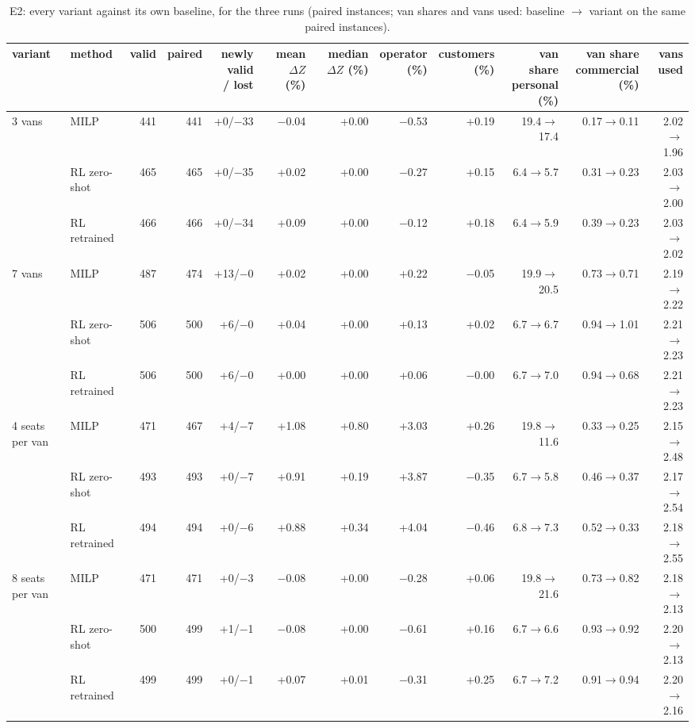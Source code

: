 \begin{table}[H]\centering
\scriptsize
\caption{E2: every variant against its own baseline, for the three runs (paired instances; van shares and vans used: baseline $\to$ variant on the same paired instances).}\label{tab:expE2}
\begin{adjustbox}{max width=\textwidth}\begin{tabular}{llrrrrrrrrrr}\toprule
variant & method & valid & paired & \shortstack{newly valid\\/ lost} & \shortstack{mean\\$\Delta Z$ (\%)} & \shortstack{median\\$\Delta Z$ (\%)} & \shortstack{operator\\(\%)} & \shortstack{customers\\(\%)} & \shortstack{van share\\personal (\%)} & \shortstack{van share\\commercial (\%)} & vans used \\ \midrule
3 vans & MILP & 441 & 441 & +0/$-$33 & $-$0.04 & +0.00 & $-$0.53 & +0.19 & 19.4$\to$17.4 & 0.17$\to$0.11 & 2.02$\to$1.96 \\
 & RL zero-shot & 465 & 465 & +0/$-$35 & +0.02 & +0.00 & $-$0.27 & +0.15 & 6.4$\to$5.7 & 0.31$\to$0.23 & 2.03$\to$2.00 \\
 & RL retrained & 466 & 466 & +0/$-$34 & +0.09 & +0.00 & $-$0.12 & +0.18 & 6.4$\to$5.9 & 0.39$\to$0.23 & 2.03$\to$2.02 \\
7 vans & MILP & 487 & 474 & +13/$-$0 & +0.02 & +0.00 & +0.22 & $-$0.05 & 19.9$\to$20.5 & 0.73$\to$0.71 & 2.19$\to$2.22 \\
 & RL zero-shot & 506 & 500 & +6/$-$0 & +0.04 & +0.00 & +0.13 & +0.02 & 6.7$\to$6.7 & 0.94$\to$1.01 & 2.21$\to$2.23 \\
 & RL retrained & 506 & 500 & +6/$-$0 & +0.00 & +0.00 & +0.06 & $-$0.00 & 6.7$\to$7.0 & 0.94$\to$0.68 & 2.21$\to$2.23 \\
4 seats per van & MILP & 471 & 467 & +4/$-$7 & +1.08 & +0.80 & +3.03 & +0.26 & 19.8$\to$11.6 & 0.33$\to$0.25 & 2.15$\to$2.48 \\
 & RL zero-shot & 493 & 493 & +0/$-$7 & +0.91 & +0.19 & +3.87 & $-$0.35 & 6.7$\to$5.8 & 0.46$\to$0.37 & 2.17$\to$2.54 \\
 & RL retrained & 494 & 494 & +0/$-$6 & +0.88 & +0.34 & +4.04 & $-$0.46 & 6.8$\to$7.3 & 0.52$\to$0.33 & 2.18$\to$2.55 \\
8 seats per van & MILP & 471 & 471 & +0/$-$3 & $-$0.08 & +0.00 & $-$0.28 & +0.06 & 19.8$\to$21.6 & 0.73$\to$0.82 & 2.18$\to$2.13 \\
 & RL zero-shot & 500 & 499 & +1/$-$1 & $-$0.08 & +0.00 & $-$0.61 & +0.16 & 6.7$\to$6.6 & 0.93$\to$0.92 & 2.20$\to$2.13 \\
 & RL retrained & 499 & 499 & +0/$-$1 & +0.07 & +0.01 & $-$0.31 & +0.25 & 6.7$\to$7.2 & 0.91$\to$0.94 & 2.20$\to$2.16 \\
\bottomrule\end{tabular}\end{adjustbox}\end{table}
